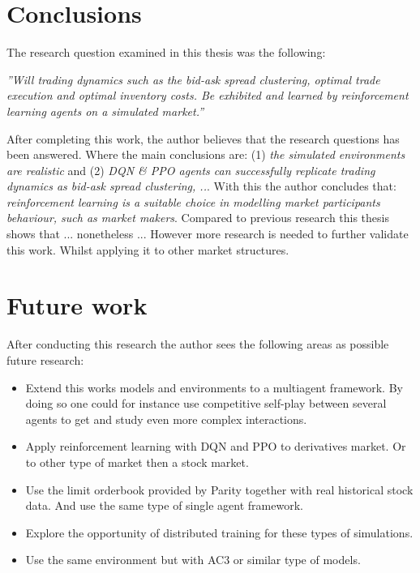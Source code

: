 \documentclass{kththesis}
\theoremstyle{definition}
\begin{document}
\newpage

\section{Conclusions}
The research question examined in this thesis was the following:
\begin{displayquote}
\it{''Will trading dynamics such as the bid-ask spread clustering, optimal trade execution and optimal inventory costs. Be exhibited and learned by reinforcement learning agents on a simulated market.''}
\end{displayquote}
After completing this work, the author believes that the research questions has been answered. Where the main conclusions are: (1) \textit{the simulated environments are realistic} and (2) \textit{DQN \& PPO agents can successfully replicate trading dynamics as bid-ask spread clustering, ..}. With this the author concludes that: \textit{reinforcement learning is a suitable choice in modelling market participants behaviour, such as market makers}. Compared to previous research this thesis shows that ... nonetheless ... However more research is needed to further validate this work. Whilst applying it to other market structures.

\section{Future work}
After conducting this research the author sees the following areas as possible future research:

\begin{itemize}
    \item Extend this works models and environments to a multiagent framework. By doing so one could for instance use competitive self-play between several agents to get and study even more complex interactions.
    
    \item Apply reinforcement learning with DQN and PPO to derivatives market. Or to other type of market then a stock market.
    
    \item Use the limit orderbook provided by Parity together with real historical stock data. And use the same type of single agent framework.
    
    \item Explore the opportunity of distributed training for these types of simulations.
    
    \item Use the same environment but with AC3 or similar type of models.
\end{itemize}
\end{document}
